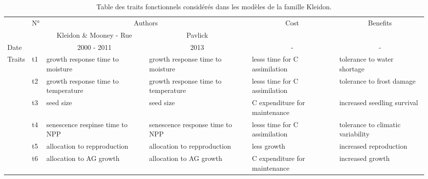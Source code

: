 \documentclass[french]{article}
\begin{document}
{%
 \nocite{TitlesOn}
 
 
 
 
 
\begin{landscape}
\appendix

\begin{table}[htbp]
  \centering
  \caption{Table des traits fonctionnels considérés dans les modèles de la famille Kleidon.}
    \begin{tabular}{rrrrrr}
    \toprule
          & N° & \multicolumn{2}{c}{Authors} & \multicolumn{1}{c}{Cost} & \multicolumn{1}{c}{Benefits} \\
          &       & \multicolumn{1}{c}{Kleidon \& Mooney - Rue} & \multicolumn{1}{c}{Pavlick} &       &  \\
    \midrule
    \multicolumn{1}{l}{Date} &       & \multicolumn{1}{c}{2000 - 2011} & \multicolumn{1}{c}{2013} & \multicolumn{1}{c}{-} & \multicolumn{1}{c}{-} \\
    \midrule
    \multicolumn{1}{l}{Traits} & \multicolumn{1}{l}{t1} & \multicolumn{1}{l}{growth response time to moisture} & \multicolumn{1}{l}{growth response time to moisture} & \multicolumn{1}{l}{lesss time for C assimilation} & \multicolumn{1}{l}{tolerance to water shortage} \\
    \multicolumn{1}{l}{} & \multicolumn{1}{l}{t2} & \multicolumn{1}{l}{growth response time to temperature} & \multicolumn{1}{l}{growth response time to temperature} & \multicolumn{1}{l}{lesss time for C assimilation} & \multicolumn{1}{l}{tolerance to frost damage} \\
    \multicolumn{1}{l}{} & \multicolumn{1}{l}{t3} & \multicolumn{1}{l}{seed size} & \multicolumn{1}{l}{seed size} & \multicolumn{1}{l}{C expenditure for maintenance} & \multicolumn{1}{l}{increased seedling survival} \\
    \multicolumn{1}{l}{} & \multicolumn{1}{l}{t4} & \multicolumn{1}{l}{senescence respinse time to NPP} & \multicolumn{1}{l}{senescence response time to NPP} & \multicolumn{1}{l}{lesss time for C assimilation} & \multicolumn{1}{l}{tolerance to climatic variability} \\
    \multicolumn{1}{l}{} & \multicolumn{1}{l}{t5} & \multicolumn{1}{l}{allocation to repproduction} & \multicolumn{1}{l}{allocation to repproduction} & \multicolumn{1}{l}{less growth} & \multicolumn{1}{l}{increased reproduction} \\
    \multicolumn{1}{l}{} & \multicolumn{1}{l}{t6} & \multicolumn{1}{l}{allocation to AG growth} & \multicolumn{1}{l}{allocation to AG growth} & \multicolumn{1}{l}{C expenditure for maintenance} & \multicolumn{1}{l}{increased growth} \\

\end{tabular}
\end{table}
\end{landscape}}
\end{document}
